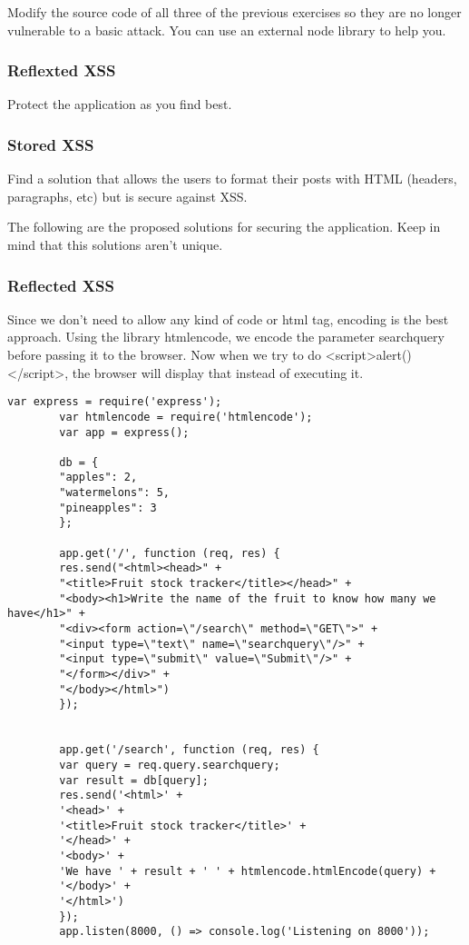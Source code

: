 \begin{Exercise}[label={websec-xss-prevention}]
	Modify the source code of all three of the previous exercises so they are no longer vulnerable to a basic attack. You can use an external node library to help you.
	\subsubsection{Reflexted XSS}
	Protect the application as you find best.
	\subsubsection{Stored XSS}
	Find a solution that allows the users to format their posts with HTML (headers, paragraphs, etc) but is secure against XSS.
\end{Exercise}
\begin{Answer}[ref={websec-xss-prevention}]
	The following are the proposed solutions for securing the application. Keep in mind that this solutions aren't unique.
	
	\subsubsection{Reflected XSS}
	Since we don't need to allow any kind of code or html tag, encoding is the best approach. Using the library htmlencode, we encode the parameter searchquery before passing it to the browser. Now when we try to do <script>alert()</script>, the browser will display that instead of executing it.
		\begin{lstlisting}[style=JavaScript]
		var express = require('express');
		var htmlencode = require('htmlencode');
		var app = express();
		
		db = {
		"apples": 2,
		"watermelons": 5,
		"pineapples": 3
		};
		
		app.get('/', function (req, res) {
		res.send("<html><head>" +
		"<title>Fruit stock tracker</title></head>" +
		"<body><h1>Write the name of the fruit to know how many we have</h1>" +
		"<div><form action=\"/search\" method=\"GET\">" +
		"<input type=\"text\" name=\"searchquery\"/>" +
		"<input type=\"submit\" value=\"Submit\"/>" +
		"</form></div>" +
		"</body></html>")
		});
		
		
		app.get('/search', function (req, res) {
		var query = req.query.searchquery;
		var result = db[query];
		res.send('<html>' +
		'<head>' +
		'<title>Fruit stock tracker</title>' +
		'</head>' +
		'<body>' +
		'We have ' + result + ' ' + htmlencode.htmlEncode(query) +
		'</body>' +
		'</html>')
		});
		app.listen(8000, () => console.log('Listening on 8000'));
		\end{lstlisting}

\end{Answer}
